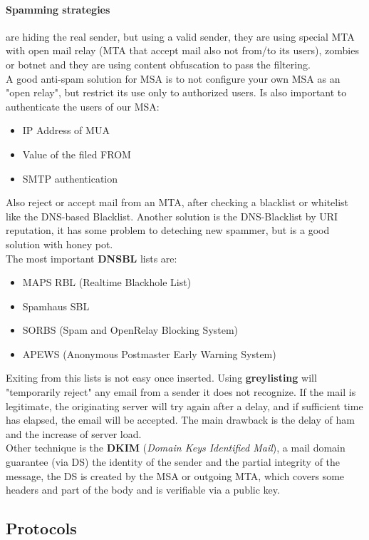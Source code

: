 \documentclass[12pt]{article}
\begin{document}
\paragraph{Spamming strategies} are hiding the real sender, but using a valid sender, they are using special MTA with open mail relay (MTA that accept mail also not from/to its users), zombies or botnet and they are using content obfuscation to pass the filtering.\\
A good anti-spam solution for MSA is to not configure your own MSA as an "open relay", but restrict its use only to authorized users. Is also important to authenticate the users of our MSA:
\begin{itemize}
  \item IP Address of MUA
  \item Value of the filed FROM
  \item SMTP authentication
\end{itemize}
Also reject or accept mail from an MTA, after checking a blacklist or whitelist like the DNS-based Blacklist. Another solution is the DNS-Blacklist by URI reputation, it has some problem to deteching new spammer, but is a good solution with honey pot.\\
The most important \textbf{DNSBL} lists are:
\begin{itemize}
  \item MAPS RBL (Realtime Blackhole List)
  \item Spamhaus SBL
  \item SORBS (Spam and OpenRelay Blocking System)
  \item APEWS (Anonymous Postmaster Early Warning System)
\end{itemize}
Exiting from this lists is not easy once inserted. Using \textbf{greylisting} will "temporarily reject" any email from a sender it does not recognize. If the mail is legitimate, the originating server will try again after a delay, and if sufficient time has elapsed, the email will be accepted. The main drawback is the delay of ham and the increase of server load.\\
Other technique is the \textbf{DKIM} (\textit{Domain Keys Identified Mail}), a mail domain guarantee (via DS) the identity of the sender and the partial integrity of the message, the DS is created by the MSA or outgoing MTA, which covers some headers and part of the body and is verifiable via a public key.

\subsection{Protocols}
\end{document}
